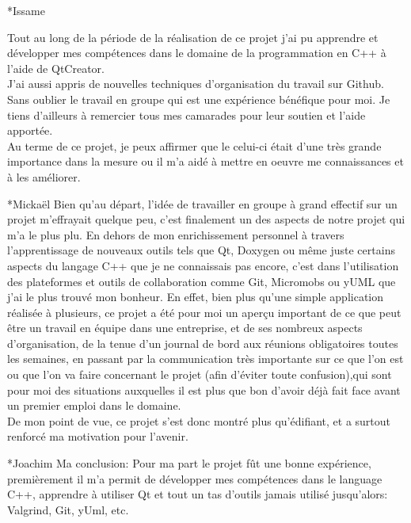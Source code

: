 \documentclass[a4paper, 12pt]{report}
\begin{document}
\begin{chapter}
		\begin{section}*{Issame}

		Tout au long de la période de la réalisation de ce projet j'ai pu apprendre et développer mes compétences dans le domaine de la programmation
		en C++ à l'aide de QtCreator.\\
		J'ai aussi appris de nouvelles techniques d'organisation du travail sur Github.\\
		Sans oublier le travail en groupe qui est une expérience bénéfique pour moi. Je tiens d'ailleurs à remercier tous mes camarades pour leur
		soutien et l'aide apportée.\\

		Au terme de ce projet, je peux affirmer que le celui-ci était d’une très grande importance dans la mesure ou il m’a aidé à mettre en oeuvre
		me connaissances et à les améliorer.

		\end{section}

		\begin{section}*{Mickaël}
		Bien qu'au départ, l'idée de travailler en groupe à grand effectif sur un projet m'effrayait quelque peu,
		c'est finalement un des aspects de notre projet qui m'a le plus plu.
		En dehors de mon enrichissement personnel à travers l'apprentissage de nouveaux outils tels que Qt, Doxygen ou même juste certains aspects du
		langage C++ que je ne connaissais pas encore, c'est dans l'utilisation des plateformes et outils de collaboration comme Git, Micromobs ou yUML
		que j'ai le plus trouvé mon bonheur. En effet, bien plus qu'une simple application réalisée à plusieurs, ce projet a été pour moi un aperçu
		important de ce que peut être un travail en équipe dans une entreprise, et de ses nombreux aspects d'organisation, de la tenue d'un journal de
		bord aux réunions obligatoires toutes les semaines, en passant par la communication très importante sur ce que l'on est ou que l'on va faire
		concernant le projet (afin d'éviter toute confusion),qui sont pour moi des situations auxquelles il est plus que bon d'avoir déjà fait face
		avant un premier emploi dans le domaine.\\
		De mon point de vue, ce projet s'est donc montré plus qu'édifiant, et a surtout renforcé ma motivation pour l'avenir.\\
		\end{section}

		\begin{section}*{Joachim}
		Ma conclusion: Pour ma part le projet fût une bonne expérience, premièrement il m'a permit de développer mes compétences dans le language
		C++, apprendre à utiliser Qt et tout un tas d'outils jamais utilisé jusqu'alors: Valgrind, Git, yUml, etc.\\


\end{section}
\end{chapter}
\end{document}
